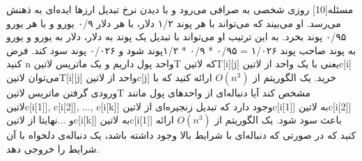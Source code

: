 
‌مسئله[10]
روزی شخصی به صرافی می‌رود و با دیدن نرخ تبدیل ارزها ایده‌ای به ذهنش می‌رسد. او می‌بیند که می‌تواند با هر پوند ۱/۲ دلار، با هر دلار ۰/۹ یورو و با هر یورو ۰/۹۵ پوند بخرد. به این ترتیب او می‌تواند با تبدیل یک پوند به دلار، دلار به یورو و یورو به پوند صاحب پوند ۱/۰۲۶ = ۰/۹۵ * ۰/۹ * ۱/۲پوند شود و ۰/۰۲۶ پوند سود کند.
فرض کنید n واحد پول داریم و یک ماتریس ‌لاتین{T} که ‌لاتین{T[i][j]} یعنی با یک واحد از ‌لاتین{c[i]} می‌توان ‌لاتین{T[i][j]} واحد از ‌لاتین{c[j]} خرید.
 یک الگوریتم از $O(n^3)$ ارائه کنید که با ورودی گرفتن ماتریس ‌لاتین{T} مشخص کند آیا دنباله‌ای از واحد‌های پول مانند ‌لاتین{c[i[1]], c[i[2]], ..., c[i[k]]} وجود دارد که تبدیل زنجیره‌ای از ‌لاتین{c[i[1]]} به ‌لاتین{c[i[2]]} و ...نهایتا از ‌لاتین{c[i[k]]} به ‌لاتین{c[i[1]]} باعث سود شود.  
 یک الگوریتم از $O(n^3)$ ارائه کنید که در صورتی که دنباله‌ای با شرایط بالا وجود داشته باشد، یک دنباله‌ی دلخواه با آن شرایط را خروجی دهد. 











